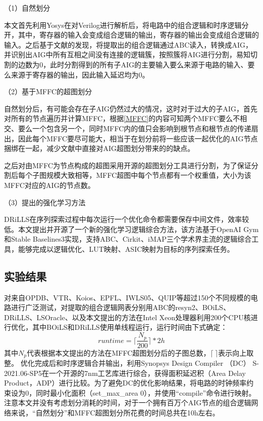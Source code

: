 （1）自然划分

本文首先利用Yosys在对Verilog进行解析后，将电路中的组合逻辑和时序逻辑分开，其中，寄存器的输入会变成组合逻辑的输出，寄存器的输出会变成组合逻辑的输入。之后基于文献\cite{Moucheng_Yang}的发现，将提取出的组合逻辑通过ABC读入，转换成AIG，并识别出AIG中所有互相之间没有连接的逻辑簇，按照簇将AIG进行分割，易知切割的边数为0，此时分割得到的所有子AIG的主要输入要么来源于电路的输入、要么来源于寄存器的输出，因此输入延迟均为0。

（2）基于MFFC的超图划分

自然划分后，有可能会存在子AIG仍然过大的情况，这时对于过大的子AIG，首先对所有的节点遍历并计算MFFC，根据\ref{MFFC}的内容可知两个MFFC要么不相交、要么一个包含另一个，同时MFFC内的值只会影响到根节点和根节点的传递扇出，因此每个MFFC要尽可能大，相当于在划分前将一些应该一起优化的AIG节点捆绑在一起，减少文献\cite{LS:LSOracle}中直接对AIG超图划分带来的的缺点。

之后对由MFFC为节点构成的超图采用开源的超图划分工具\cite{KaHyPar}进行分割，为了保证分割后每个子图规模大致相等，MFFC超图中每个节点都有一个权重值，大小为该MFFC对应的AIG的节点数。

（3）提出的强化学习方法

DRiLLS\cite{LS:DRiLLS}在序列探索过程中每次运行一个优化命令都需要保存中间文件，效率较低。本文提出并开源了一个新的强化学习逻辑综合方法，该方法基于OpenAI Gym\cite{AI:gym}和Stable Baselines3\cite{AI:stable-baselines3}实现，支持ABC\cite{LS:ABC}、Cirkit\cite{LS:cirkit}、iMAP\cite{LS:iMAP}三个学术界主流的逻辑综合工具，能够完成以逻辑优化、LUT映射、ASIC映射为目标的序列探索任务。

\subsection{实验结果}

对来自OPDB\cite{LS:OPDB}、VTR\cite{FPGA:vtr8}、Koios\cite{FPGA:Koios}、EPFL\cite{LS:EPFL_benchs_iwls,LS:EPFL_benchs_github}、IWLS05\cite{LS:iwls05}、QUIP\cite{LS:quip}等超过150个不同规模的电路进行广泛测试，对提取的组合逻辑网表分别用ABC的resyn2、BOiLS\cite{LS:BOiLS}、DRiLLS\cite{LS:DRiLLS}、LSOracle\cite{LS:LSOracle}、以及本文提出的方法在Intel Xeon处理器利用200个CPU核进行优化，其中BOiLS和DRiLLS使用单线程运行，运行时间由下式确定：
\begin{equation}
    runtime = \lceil \frac{N_{p}}{200} \rceil * 2 h
\end{equation}
其中$N_{p}$代表根据本文提出的方法在MFFC超图划分后的子图总数，$\lceil \ \rceil$表示向上取整。
优化完成后和时序逻辑合并输出，利用Synopsys Design Compiler （DC） S-2021.06-SP5在一个开源的7nm工艺库\cite{ASAP7_github}进行综合，获得面积延迟积（Area Delay Product，ADP）进行比较。为了避免DC的优化影响结果，将电路的时钟频率约束设为0，同时最小化面积（set\_max\_area 0），并使用“compile”命令进行映射。
注意本文并没有考虑划分消耗的时间，对于一个拥有百万个AIG节点的组合逻辑网络来说，“自然划分”和MFFC超图划分所花费的时间总共在10h左右。

